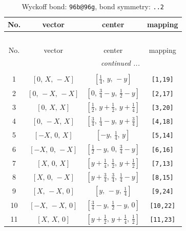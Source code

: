 \documentclass[fleqn,8pt]{jsarticle}
\begin{document}
\begin{longtable}{cccc}
\caption{Wyckoff bond: {\tt 96b@96g}, bond symmetry: {\tt ..2}}
 \\
 \hline \hline
No. & vector & center & mapping \\ \hline \endfirsthead

\multicolumn{3}{l}{\tablename\ \thetable{}} \\
 \hline \hline
No. & vector & center & mapping \\ \hline \endhead

 \hline \hline
\multicolumn{3}{r}{\footnotesize\it continued ...} \\ \endfoot

 \hline \hline
\multicolumn{3}{r}{} \\ \endlastfoot

1 & $\left[ 0,\, X,\, - X \right]$ & $\left[ \frac{1}{4},\, y,\, - y \right]$ & {\tt [1,19]} \\ \hline
2 & $\left[ 0,\, - X,\, - X \right]$ & $\left[ 0,\, \frac{3}{4} - y,\, \frac{1}{2} - y \right]$ & {\tt [2,17]} \\ \hline
3 & $\left[ 0,\, X,\, X \right]$ & $\left[ \frac{1}{2},\, y + \frac{1}{2},\, y + \frac{1}{4} \right]$ & {\tt [3,20]} \\ \hline
4 & $\left[ 0,\, - X,\, X \right]$ & $\left[ \frac{3}{4},\, \frac{1}{4} - y,\, y + \frac{3}{4} \right]$ & {\tt [4,18]} \\ \hline
5 & $\left[ - X,\, 0,\, X \right]$ & $\left[ - y,\, \frac{1}{4},\, y \right]$ & {\tt [5,14]} \\ \hline
6 & $\left[ - X,\, 0,\, - X \right]$ & $\left[ \frac{1}{2} - y,\, 0,\, \frac{3}{4} - y \right]$ & {\tt [6,16]} \\ \hline
7 & $\left[ X,\, 0,\, X \right]$ & $\left[ y + \frac{1}{4},\, \frac{1}{2},\, y + \frac{1}{2} \right]$ & {\tt [7,13]} \\ \hline
8 & $\left[ X,\, 0,\, - X \right]$ & $\left[ y + \frac{3}{4},\, \frac{3}{4},\, \frac{1}{4} - y \right]$ & {\tt [8,15]} \\ \hline
9 & $\left[ X,\, - X,\, 0 \right]$ & $\left[ y,\, - y,\, \frac{1}{4} \right]$ & {\tt [9,24]} \\ \hline
10 & $\left[ - X,\, - X,\, 0 \right]$ & $\left[ \frac{3}{4} - y,\, \frac{1}{2} - y,\, 0 \right]$ & {\tt [10,22]} \\ \hline
11 & $\left[ X,\, X,\, 0 \right]$ & $\left[ y + \frac{1}{2},\, y + \frac{1}{4},\, \frac{1}{2} \right]$ & {\tt [11,23]} \\ \hline

\end{longtable}
\end{document}
